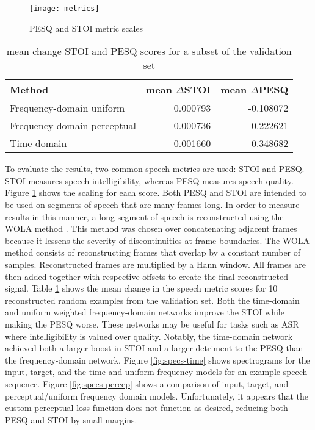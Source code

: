 \begin{figure}
	\centering
	\texttt{[image: metrics]}
	\caption{\ac{PESQ} and \ac{STOI} metric scales}
	\label{fig:metrics}
\end{figure}

\begin{table}
	\centering
	\caption{mean change STOI and PESQ scores for a subset of the validation set}
	\label{tab:results}
	\resizebox{0.5\textwidth}{!} {
	\begin{tabular}{lrr}
	\toprule
	                      Method &  mean $\Delta $STOI      &  mean $\Delta$PESQ \\
	\midrule
	    Frequency-domain uniform &         0.000793 &        -0.108072 \\
	 Frequency-domain perceptual &        -0.000736 &        -0.222621 \\
	                 Time-domain &         0.001660 &        -0.348682 \\
	\bottomrule
	\end{tabular}

	}
\end{table}

To evaluate the results, two common speech metrics are used: \ac{STOI} and \ac{PESQ}. \ac{STOI} measures speech intelligibility, whereas \ac{PESQ} measures speech quality. Figure \ref{fig:metrics} shows the scaling for each score. Both \ac{PESQ} and \ac{STOI} are intended to be used on segments of speech that are many frames long. In order to measure results in this manner, a long segment of speech is reconstructed using the \ac{WOLA} method \cite{windowSize}. This method was chosen over concatenating adjacent frames because it lessens the severity of discontinuities at frame boundaries. The \ac{WOLA} method consists of reconstructing frames that overlap by a constant number of samples. Reconstructed frames are multiplied by a Hann window. All frames are then added together with respective offsets to create the final reconstructed signal. Table \ref{tab:results} shows the mean change in the speech metric scores for 10 reconstructed random  examples from the validation set. Both the time-domain and uniform weighted frequency-domain networks improve the \ac{STOI} while making the \ac{PESQ} worse. These networks may be useful for tasks such as \ac{ASR} where intelligibility is valued over quality. Notably, the time-domain network achieved both a larger boost in \ac{STOI} and a larger detriment to the \ac{PESQ} than the frequency-domain network. Figure \ref{fig:specs-time} shows spectrograms for the input, target, and the time and uniform frequency models for an example speech sequence. Figure \ref{fig:specs-percep} shows a comparison of input, target, and perceptual/uniform frequency domain models. Unfortunately, it appears that the custom perceptual loss function does not function as desired, reducing both \ac{PESQ} and \ac{STOI} by small margins.

